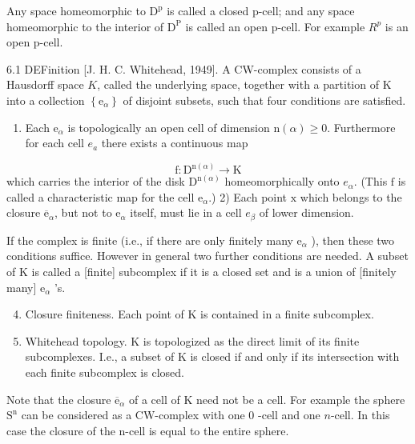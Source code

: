 \documentclass[10pt]{article}
\begin{document}
Any space homeomorphic to $\mathrm{D}^{\mathrm{p}}$ is called a closed $\mathrm{p}$-cell; and any space homeomorphic to the interior of $\mathrm{D}^{\mathrm{P}}$ is called an open p-cell. For example $R^{p}$ is an open p-cell.

6.1 DEFinition [J. H. C. Whitehead, 1949]. A CW-complex consists of a Hausdorff space $K$, called the underlying space, together with a partition of $\mathrm{K}$ into a collection $\left\{\mathrm{e}_{\alpha}\right\}$ of disjoint subsets, such that four conditions are satisfied.

\begin{enumerate}
  \item Each $\mathrm{e}_{\alpha}$ is topologically an open cell of dimension $\mathrm{n}(\alpha) \geq 0$. Furthermore for each cell $e_{a}$ there exists a continuous map
\end{enumerate}
$$
\mathrm{f}: \mathrm{D}^{\mathrm{n}(\alpha)} \rightarrow \mathrm{K}
$$
which carries the interior of the disk $\mathrm{D}^{\mathrm{n}(\alpha)}$ homeomorphically onto $e_{\alpha}$. (This $\mathrm{f}$ is called a characteristic map for the cell $\mathrm{e}_{\alpha}$.) 2) Each point $\mathrm{x}$ which belongs to the closure $\overline{\mathrm{e}}_{\alpha}$, but not to $\mathrm{e}_{\alpha}$ itself, must lie in a cell $e_{\beta}$ of lower dimension.

If the complex is finite (i.e., if there are only finitely many $\mathrm{e}_{\alpha}$ ), then these two conditions suffice. However in general two further conditions are needed. A subset of $\mathrm{K}$ is called a [finite] subcomplex if it is a closed set and is a union of [finitely many] $\mathrm{e}_{\alpha}$ 's.

\begin{enumerate}
  \setcounter{enumi}{3}
  \item Closure finiteness. Each point of $\mathrm{K}$ is contained in a finite subcomplex.

  \item Whitehead topology. $\mathrm{K}$ is topologized as the direct limit of its finite subcomplexes. I.e., a subset of $\mathrm{K}$ is closed if and only if its intersection with each finite subcomplex is closed.

\end{enumerate}
Note that the closure $\overline{\mathrm{e}}_{\alpha}$ of a cell of $\mathrm{K}$ need not be a cell. For example the sphere $\mathrm{S}^{\mathrm{n}}$ can be considered as a $\mathrm{CW}$-complex with one 0 -cell and one $n$-cell. In this case the closure of the $\mathrm{n}$-cell is equal to the entire sphere.
\end{document}
